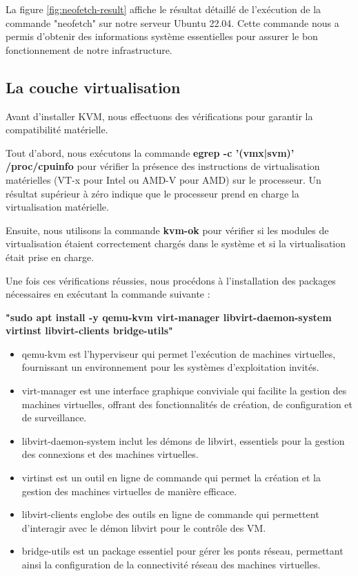 La figure \ref{fig:neofetch-result} affiche le résultat détaillé de l'exécution de la commande "neofetch" sur notre serveur Ubuntu 22.04. Cette commande nous a permis d'obtenir des informations système essentielles pour assurer le bon fonctionnement de notre infrastructure.


\subsection{La couche virtualisation}

Avant d'installer KVM, nous effectuons des vérifications pour garantir la compatibilité matérielle. 

Tout d'abord, nous exécutons la commande \textbf{egrep -c '(vmx|svm)' /proc/cpuinfo} pour vérifier la présence des instructions de virtualisation matérielles (VT-x pour Intel ou AMD-V pour AMD) sur le processeur. Un résultat supérieur à zéro indique que le processeur prend en charge la virtualisation matérielle.

Ensuite, nous utilisons la commande \textbf{kvm-ok} pour vérifier si les modules de virtualisation étaient correctement chargés dans le système et si la virtualisation était prise en charge.

Une fois ces vérifications réussies, nous procédons à l'installation des packages nécessaires en exécutant la commande suivante :


\textbf{"sudo apt install -y qemu-kvm virt-manager libvirt-daemon-system virtinst libvirt-clients bridge-utils"}

\begin{itemize}
\item  qemu-kvm est l'hyperviseur qui permet l'exécution de machines virtuelles, fournissant un environnement pour les systèmes d'exploitation invités.
\item virt-manager est une interface graphique conviviale qui facilite la gestion des machines virtuelles, offrant des fonctionnalités de création, de configuration et de surveillance.
\item libvirt-daemon-system inclut les démons de libvirt, essentiels pour la gestion des connexions et des machines virtuelles.
\item virtinst est un outil en ligne de commande qui permet la création et la gestion des machines virtuelles de manière efficace.
\item libvirt-clients englobe des outils en ligne de commande qui permettent d'interagir avec le démon libvirt pour le contrôle des VM.
\item bridge-utils est un package essentiel pour gérer les ponts réseau, permettant ainsi la configuration de la connectivité réseau des machines virtuelles.
\end{itemize}









